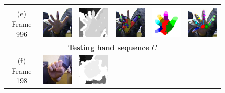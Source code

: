 \begin{figure}
\begin{tabular}{@{}cc@{}c@{}c@{}c@{}c@{}}
		\label{fig/hand/multi4} \\
		\raisebox{1cm}{\parbox{2cm}{\centering (e)\\Frame 996}} & 
		\includegraphics[width=2.35cm]{fig/hand/qual/rgb/image_0996.png} &
		\includegraphics[width=2.35cm]{fig/hand/qual/depth/image_0996.png} &
		\includegraphics[width=2.35cm]{fig/hand/qual/forth/image_0996.png} &
		\includegraphics[width=2.35cm]{fig/hand/qual/class/class-996.png} &
		\includegraphics[width=2.35cm]{fig/hand/qual/vote/image_0996.png}
		\label{fig/hand/multi5} \\ 
		\hline 
		\multicolumn{6}{c}{\textbf{Testing hand sequence $C$}} \\ 
		\hline 
		\raisebox{1cm}{\parbox{2cm}{\centering (f)\\Frame 198}} &
		\includegraphics[width=2.35cm]{fig/hand/qual/rgb/image_0198.png} &
		\includegraphics[width=2.35cm]{fig/hand/qual/depth/image_0198.png} &

\end{tabular}
\end{figure}
